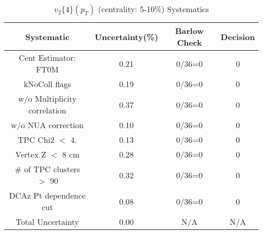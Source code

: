 \begin{table}[htbp]
\caption{$v_2\{4\}(p_{T})$ (centrality: 5-10\%) Systematics}
\label{tab:Sys_pTDiffv24ChFull}
\centering
\begin{tabular}{|c|c|c|c|}
\hline
Systematic & Uncertainty(\%) & Barlow Check & Decision \\
\hline
Cent Estimator: FT0M & 0.21 & 0/36=0 & 0 \\
kNoColl flags & 0.19 & 0/36=0 & 0 \\
w/o Multiplicity correlation & 0.37 & 0/36=0 & 0 \\
w/o NUA correction & 0.10 & 0/36=0 & 0 \\
TPC Chi2 $<$ 4. & 0.13 & 0/36=0 & 0 \\
Vertex Z $<$ 8 cm & 0.28 & 0/36=0 & 0 \\
\# of TPC clusters $>$ 90 & 0.32 & 0/36=0 & 0 \\
DCAz Pt dependence cut & 0.08 & 0/36=0 & 0 \\
\hline
Total Uncertainty & 0.00 & N/A & N/A \\
\hline
\end{tabular}
\end{table}
